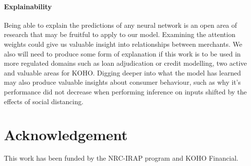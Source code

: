 \documentclass{article}
\begin{document}
\paragraph{Explainability} Being able to explain the predictions of any neural network is an open area of research that may be fruitful to apply to our model. Examining the attention weights could give us valuable insight into relationships between merchants. We also will need to produce some form of explanation if this work is to be used in more regulated domains such as loan adjudication or credit modelling, two active and valuable areas for KOHO. Digging deeper into what the model has learned may also produce valuable insights about consumer behaviour, such as why it's performance did not decrease when performing inference on inputs shifted by the effects of social distancing.

\section{Acknowledgement}
This work has been funded by the NRC-IRAP program and KOHO Financial.



\end{document}
